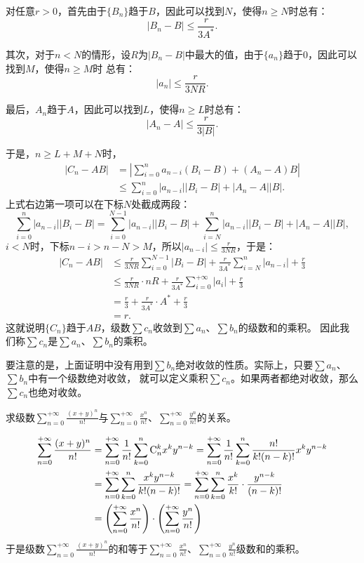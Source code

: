 \documentclass[12pt,UTF8]{ctexbook}
\begin{document}
对任意$r>0$，首先由于$\{B_n\}$趋于$B$，因此可以找到$N$，使得$n\geqslant N$时总有：
$$ |B_n - B| \leqslant \frac{r}{3A^*}. $$

其次，对于$n<N$的情形，设$R$为$|B_n-B|$中最大的值，由于$\{a_n\}$趋于$0$，因此可以找到$M$，使得$n\geqslant M$时
总有：
$$ |a_n| \leqslant \frac{r}{3NR}.$$

最后，$A_n$趋于$A$，因此可以找到$L$，使得$n\geqslant L$时总有：
$$ |A_n - A| \leqslant \frac{r}{3|B|}.$$

于是，$n\geqslant L+M+N$时，
\begin{align*}
    |C_n - AB| &= \left|\sum_{i=0}^{n} a_{n-i} (B_i - B) + (A_n - A) B \right| \\
    &\leqslant  \sum_{i=0}^{n} |a_{n-i} ||B_i - B | + |A_n - A| |B|. 
\end{align*}
上式右边第一项可以在下标$N$处截成两段：
$$ \sum_{i=0}^{n} |a_{n-i} ||B_i - B | = \sum_{i=0}^{N-1} |a_{n-i}| |B_i - B| + \sum_{i=N}^{n} |a_{n-i}| |B_i - B| + |A_n - A| |B|,$$
$i<N$时，下标$n-i > n-N >M$，所以$|a_{n-i}| \leqslant \frac{r}{3NR}$，于是：
\begin{align*}
    |C_n - AB| &\leqslant \frac{r}{3NR} \sum_{i=0}^{N-1} |B_i - B| + \frac{r}{3A^*} \sum_{i=N}^{n} |a_{n-i}| + \frac{r}{3} \\
    &\leqslant \frac{r}{3NR} \cdot nR +  \frac{r}{3A^*} \sum_{i=0}^{+\infty} |a_i| + \frac{r}{3} \\
    &= \frac{r}{3} + \frac{r}{3A^*}\cdot A^* + \frac{r}{3} \\
    &= r.
\end{align*}
这就说明$\{C_n\}$趋于$AB$，级数$\sum c_n$收敛到$\sum a_n$、$\sum b_n$的级数和的乘积。
因此我们称$\sum c_n$是$\sum a_n$、$\sum b_n$的乘积。

要注意的是，上面证明中没有用到$\sum b_n$绝对收敛的性质。实际上，只要$\sum a_n$、$\sum b_n$中有一个级数绝对收敛，
就可以定义乘积$\sum c_n$。如果两者都绝对收敛，那么$\sum c_n$也绝对收敛。

\begin{et}
    求级数$\sum_{n=0}^{+\infty} \frac{(x + y)^n}{n!}$与$\sum_{n=0}^{+\infty} \frac{x^n}{n!}$、$\sum_{n=0}^{+\infty} \frac{y^n}{n!}$的关系。
\end{et}

\begin{so}
    \begin{align*}
        \sum_{n=0}^{+\infty} \frac{(x + y)^n}{n!} &= \sum_{n=0}^{+\infty} \frac{1}{n!}\sum_{k=0}^n \mathrm{C}_{n}^{k} x^k y^{n-k} = \sum_{n=0}^{+\infty} \frac{1}{n!}\sum_{k=0}^n \frac{n!}{k!(n-k)!} x^k y^{n-k} \\
        &= \sum_{n=0}^{+\infty}\sum_{k=0}^n \frac{x^k y^{n-k}}{k!(n-k)!} = \sum_{n=0}^{+\infty}\sum_{k=0}^n \frac{x^k}{k!} \cdot \frac{y^{n-k}}{(n-k)!} \\
        &= \left(\sum_{n=0}^{+\infty} \frac{x^n}{n!} \right)
        \cdot \left(\sum_{n=0}^{+\infty} \frac{y^n}{n!}\right)
    \end{align*}
    于是级数$\sum_{n=0}^{+\infty} \frac{(x + y)^n}{n!}$的和等于$\sum_{n=0}^{+\infty} \frac{x^n}{n!}$、$\sum_{n=0}^{+\infty} \frac{y^n}{n!}$级数和的乘积。
\end{so}
\end{document}
